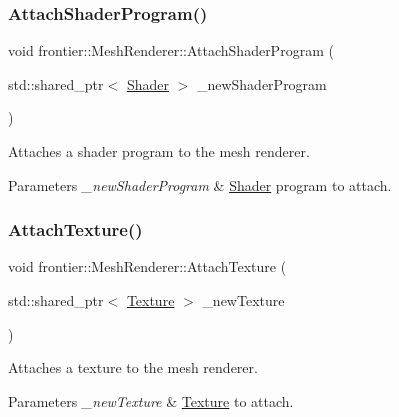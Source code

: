 \subsubsection{\texorpdfstring{Attach\+Shader\+Program()}{AttachShaderProgram()}}
{\footnotesize\ttfamily void frontier\+::\+Mesh\+Renderer\+::\+Attach\+Shader\+Program (\begin{DoxyParamCaption}\item[{std\+::shared\+\_\+ptr$<$ \hyperlink{classfrontier_1_1_shader}{Shader} $>$}]{\+\_\+new\+Shader\+Program }\end{DoxyParamCaption})}



Attaches a shader program to the mesh renderer. 


\begin{DoxyParams}{Parameters}
{\em \+\_\+new\+Shader\+Program} & \hyperlink{classfrontier_1_1_shader}{Shader} program to attach. \\
\hline
\end{DoxyParams}
\mbox{\label{classfrontier_1_1_mesh_renderer_a5c915d5fba6a56841afe98123e8cfa5d}} 
\subsubsection{\texorpdfstring{Attach\+Texture()}{AttachTexture()}}
{\footnotesize\ttfamily void frontier\+::\+Mesh\+Renderer\+::\+Attach\+Texture (\begin{DoxyParamCaption}\item[{std\+::shared\+\_\+ptr$<$ \hyperlink{classfrontier_1_1_texture}{Texture} $>$}]{\+\_\+new\+Texture }\end{DoxyParamCaption})}



Attaches a texture to the mesh renderer. 


\begin{DoxyParams}{Parameters}
{\em \+\_\+new\+Texture} & \hyperlink{classfrontier_1_1_texture}{Texture} to attach. \\
\hline
\end{DoxyParams}
\mbox{\label{classfrontier_1_1_mesh_renderer_a082036277e00227a57a16a542e2b57e3}} 
